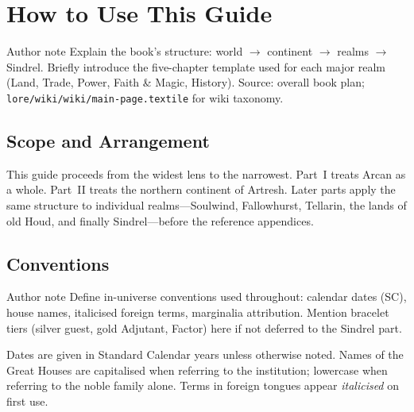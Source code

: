 \chapter{How to Use This Guide}

\begin{DndComment}{Author note}
  Explain the book's structure: world $\rightarrow$ continent $\rightarrow$ realms $\rightarrow$ Sindrel.
  Briefly introduce the five-chapter template used for each major realm (Land, Trade, Power, Faith \& Magic, History).
  Source: overall book plan; \texttt{lore/wiki/wiki/main-page.textile} for wiki taxonomy.
\end{DndComment}

\section{Scope and Arrangement}

This guide proceeds from the widest lens to the narrowest. Part~I treats Arcan as a whole. Part~II treats the northern continent of Artresh. Later parts apply the same structure to individual realms---Soulwind, Fallowhurst, Tellarin, the lands of old Houd, and finally Sindrel---before the reference appendices.

\section{Conventions}

\begin{DndComment}{Author note}
  Define in-universe conventions used throughout: calendar dates (SC), house names, italicised foreign terms, marginalia attribution.
  Mention bracelet tiers (silver guest, gold Adjutant, Factor) here if not deferred to the Sindrel part.
\end{DndComment}

Dates are given in Standard Calendar years unless otherwise noted. Names of the Great Houses are capitalised when referring to the institution; lowercase when referring to the noble family alone. Terms in foreign tongues appear \emph{italicised} on first use.
